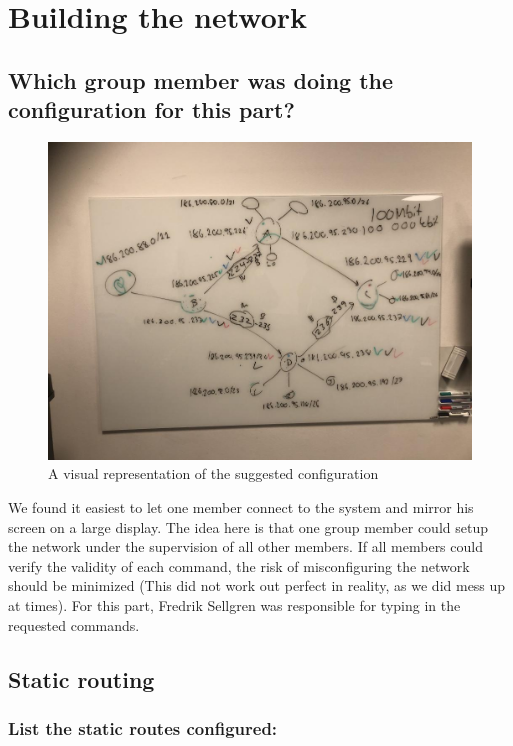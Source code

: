 \documentclass[a4paper, titlepage,12pt]{article}
\begin{document}
	\section{Building the network}
		\subsection{Which group member was doing the configuration for this part?}

		\begin{figure}[h!]
			\begin{center}
				\includegraphics[scale=0.20]{./static_img.jpg}
			\end{center}
			\caption{A visual representation of the suggested configuration}
		\end{figure}

			We found it easiest to let one member connect to the system and mirror his screen on a large display. The idea here is that one group member could setup the network under the supervision of all other members. If all members could verify the validity of each command, the risk of misconfiguring the network should be minimized (This did not work out perfect in reality, as we did mess up at times). For this part, Fredrik Sellgren was responsible for typing in the requested commands.

		\subsection{Static routing}

		\subsubsection{List the static routes configured:}
\end{document}
